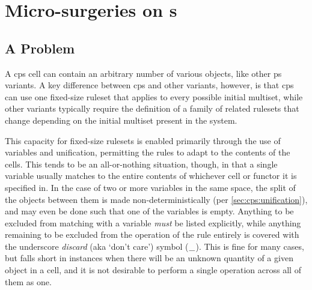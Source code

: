 \section{Micro-surgeries on  s}
\subsection{A Problem}
A \gls{cps} cell can contain an arbitrary number of various objects, like other \gls{ps} variants.  A key difference between \gls{cps} and other variants, however, is that \gls{cps} can use one fixed-size ruleset that applies to every possible initial multiset, while other variants typically require the definition of a family of related rulesets that change depending on the initial multiset present in the system.

This capacity for fixed-size rulesets is enabled primarily through the use of variables and unification, permitting the rules to adapt to the contents of the cells.  This tends to be an all-or-nothing situation, though, in that a single variable usually matches to the entire contents of whichever cell or functor it is specified in.  In the case of two or more variables in the same space, the split of the objects between them is made non-deterministically (per \cref{sec:cps:unification}), and may even be done such that one of the variables is empty.  Anything to be excluded from matching with a variable \emph{must} be listed explicitly, while anything remaining to be excluded from the operation of the rule entirely is covered with the underscore \emph{discard} (aka `don't care') symbol (\(\_\)).  This is fine for many cases, but falls short in instances when there will be an unknown quantity of a given object in a cell, and it is not desirable to perform a single operation across all of them as one.



